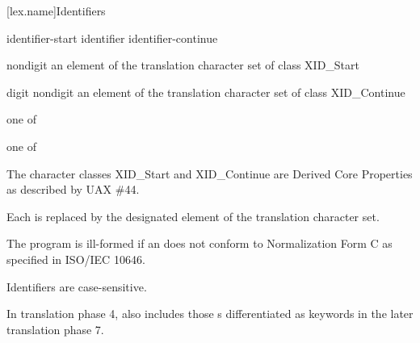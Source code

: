 \documentclass{wg21}
\begin{document}
[lex.name]{Identifiers}

%
\begin{bnf}
    \br
    identifier-start\br
    identifier identifier-continue
\end{bnf}

\begin{bnf}
    \br
    nondigit\br
    \textnormal{an element of the translation character set of class XID_Start}\\
\end{bnf}

\begin{bnf}
    \br
    digit\br
    nondigit\br
    \textnormal{an element of the translation character set of class XID\_Continue}\\
\end{bnf}

\begin{bnf}
     \textnormal{one of}\br
    \br
    \br
    \br
\end{bnf}

\begin{bnf}
     \textnormal{one of}\br
\end{bnf}

\pnum
{}%
%
The character classes XID_Start and XID_Continue
are Derived Core Properties as described by UAX \#44.

\begin{addedblock}
Each  is replaced by the designated element of the translation character set.

\end{addedblock}

The program is ill-formed
if an  does not conform to
Normalization Form C as specified in ISO/IEC 10646.
\begin{note}
    Identifiers are case-sensitive.
\end{note}
\begin{note}
    In translation phase 4,
     also includes
    those s
    differentiated as keywords
    in the later translation phase 7.
\end{note}
\end{document}
